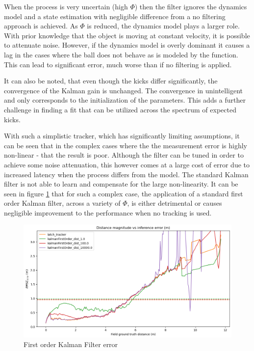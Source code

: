 \documentclass[a4paper,twoside,12pt]{report}
\begin{document}
When the process is very uncertain (high $\Phi$) then the filter ignores the dynamics model and a state estimation with negligible difference from a no filtering approach is achieved. As $\Phi$ is reduced, the dynamics model plays a larger role. With prior knowledge that the object is moving at constant velocity, it is possible to attenuate noise. However, if the dynamics model is overly dominant it causes a lag in the cases where the ball does not behave as is modeled by the function. This can lead to significant error, much worse than if no filtering is applied. 

It can also be noted, that even though the kicks differ significantly, the convergence of the Kalman gain is unchanged. The convergence in unintelligent and only corresponds to the initialization of the parameters. This adds a further challenge in finding a fit that can be utilized across the spectrum of expected kicks.

With such a simplistic tracker, which has significantly limiting assumptions, it can be seen that in the complex cases where the the measurement error is highly non-linear - that the result is poor. Although the filter can be tuned in order to achieve some noise attenuation, this however comes at a large cost of error due to increased latency when the process differs from the model. The standard Kalman filter is not able to learn and compensate for the large non-linearity. It can be seen in figure \ref{fig:fokerror} that for such a complex case, the application of a standard first order Kalman filter, across a variety of $\Phi$, is either detrimental or causes negligible improvement to the performance when no tracking is used.

\begin{figure}[h!]
\begin{center}
\includegraphics[width=13cm]{images/fok_error.png}
\caption{First order Kalman Filter error}
\label{fig:fokerror}
\end{center}
\end{figure}
\end{document}
